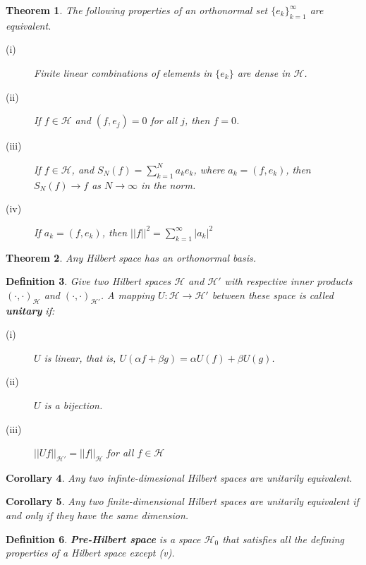\documentclass[11pt]{article}
\newtheorem{theorem}{Theorem}[subsection]
\newtheorem{definition}[theorem]{Definition}
\newtheorem{corollary}[theorem]{Corollary}
\begin{document}
\begin{theorem}
    The following properties of an orthonormal set $\{e_k\}_{k=1}^\infty$ are equivalent.
    \begin{description}
        \item[(i)] Finite linear combinations of elements in $\{e_k\}$ are dense in $\mathcal{H}$.
        \item[(ii)] If $f\in\mathcal{H}$ and $(f,e_j)=0$ for all $j$, then $f=0$.
        \item[(iii)] If $f\in\mathcal{H}$, and $S_N(f)=\sum_{k=1}^Na_ke_k$, where $a_k=(f,e_k)$, then $S_N(f)\to f$ as $N\to \infty$ in the norm.
        \item[(iv)] If $a_k=(f,e_k)$, then $||f||^2=\sum_{k=1}^\infty |a_k|^2$ 
    \end{description}
\end{theorem}

\begin{theorem}
    Any Hilbert space has an orthonormal basis.
\end{theorem}

\begin{definition}
    Give two Hilbert spaces $\mathcal{H}$ and $\mathcal{H}'$ with respective inner products $(\cdot,\cdot)_\mathcal{H}$ and $(\cdot,\cdot)_{\mathcal{H}'}$. A mapping $U:\mathcal{H}\to\mathcal{H}'$ between these space is called \textbf{unitary} if:
    \begin{description}
        \item[(i)] $U$ is linear, that is, $U(\alpha f+\beta g)=\alpha U(f)+\beta U(g)$.
        \item[(ii)] $U$ is a bijection.
        \item[(iii)] $||Uf||_{\mathcal{H}'}=||f||_{\mathcal{H}}$ for all $f\in \mathcal{H}$
    \end{description}
\end{definition}

\begin{corollary}
    Any two infinte-dimesional Hilbert spaces are unitarily equivalent.
\end{corollary}

\begin{corollary}
    Any two finite-dimensional Hilbert spaces are unitarily equivalent if and only if they have the same dimension.
\end{corollary}

\begin{definition}
    \textbf{Pre-Hilbert space} is a space $\mathcal{H}_0$ that satisfies all the defining properties of a Hilbert space except (v).
\end{definition}
\end{document}
